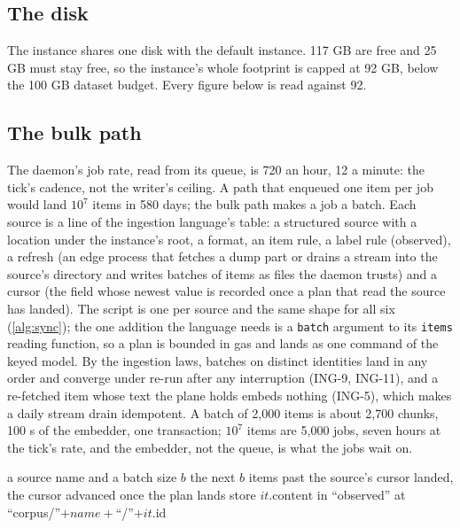 \documentclass[11pt]{article}
\theoremstyle{plain}
\theoremstyle{definition}
\theoremstyle{remark}
\newcommand{\code}[1]{\texttt{#1}}
\begin{document}
\subsection{The disk}
The instance shares one disk with the default instance. 117 GB are free and 25 GB must stay free,
so the instance's whole footprint is capped at 92 GB, below the 100 GB dataset budget. Every figure
below is read against 92.

\subsection{The bulk path}\label{sec:bulk}
The daemon's job rate, read from its queue, is 720 an hour, 12 a minute: the tick's cadence, not
the writer's ceiling. A path that enqueued one item per job would land $10^7$ items in 580 days; the
bulk path makes a job a batch. Each source is a line of the ingestion language's table: a structured
source with a location under the instance's root, a format, an item rule, a label rule (observed),
a refresh (an edge process that fetches a dump part or drains a stream into the source's directory
and writes batches of items as files the daemon trusts) and a cursor (the field whose newest value
is recorded once a plan that read the source has landed). The script is one per source and the same
shape for all six (\cref{alg:sync}); the one addition the language needs is a \code{batch} argument
to its \code{items} reading function, so a plan is bounded in gas and lands as one command of the
keyed model. By the ingestion laws, batches on distinct identities land in any order and converge
under re-run after any interruption (ING-9, ING-11), and a re-fetched item whose text the plane
holds embeds nothing (ING-5), which makes a daily stream drain idempotent. A batch of 2,000 items
is about 2,700 chunks, 100 s of the embedder, one transaction; $10^7$ items are 5,000 jobs, seven
hours at the tick's rate, and the embedder, not the queue, is what the jobs wait on.

\begin{algorithm}
\caption{One batch of a corpus source, observed, under its own origin.}\label{alg:sync}
\begin{algorithmic}[1]
\Require a source name and a batch size $b$
\Ensure the next $b$ items past the source's cursor landed, the cursor advanced once the plan lands
  \State store $it.\mathrm{content}$ in ``observed'' at ``corpus/''$+name+$``/''$+it.\mathrm{id}$
\EndFor
\end{algorithmic}
\end{algorithm}
\end{document}
